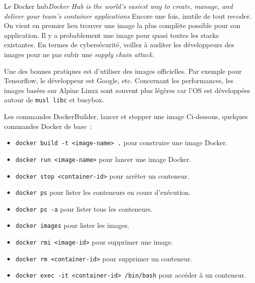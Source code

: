 \documentclass{beamer}
\begin{document}
    \begin{frame}{Le Docker hub}{\textit{Docker Hub is the world's easiest way to create, manage, and deliver your team's container applications}}
        Encore une fois, inutile de tout recoder.
        On vient en premier lieu trouver une image la plus complète possible pour son application.
        \bigbreak
        Il y a probablement une image pour quasi toutes les stacks existantes.
        \bigbreak
        En termes de cybersécurité, veillez à auditer les développeurs des images pour ne pas subir une \textit{supply chain attack}.

        Une des bonnes pratiques est d'utiliser des images officielles.
        Par exemple pour Tensorflow, le développeur est Google, etc.
        \bigbreak
        Concernant les performances, les images basées sur Alpine Linux sont souvent plus légères car l'OS est développées autour de \lstinline{musl libc} et busybox.
    \end{frame}

    \begin{frame}{Les commandes Docker}{Builder, lancer et stopper une image}
        Ci-dessous, quelques commandes Docker de base~:
        \begin{itemize}
            \item \lstinline{docker build -t <image-name> .} pour construire une image Docker.
            \item \lstinline{docker run <image-name>} pour lancer une image Docker.
            \item \lstinline{docker stop <container-id>} pour arrêter un conteneur.
            \item \lstinline{docker ps} pour lister les conteneurs en cours d'exécution.
            \item \lstinline{docker ps -a} pour lister tous les conteneurs.
            \item \lstinline{docker images} pour lister les images.
            \item \lstinline{docker rmi <image-id>} pour supprimer une image.
            \item \lstinline{docker rm <container-id>} pour supprimer un conteneur.
            \item \lstinline{docker exec -it <container-id> /bin/bash} pour accéder à un conteneur.
        \end{itemize}
    \end{frame}
\end{document}
